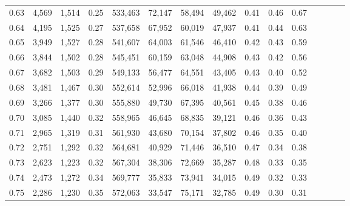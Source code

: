 \begin{tabular}{rrrcrrrrrrrrrrr}
0.63 &   4,569 &   1,514 &                                       0.25 &  533,463 &   72,147 &   58,494 &   49,462 &  0.41 &  0.46 &                         0.67 \\
0.64 &   4,195 &   1,525 &                                       0.27 &  537,658 &   67,952 &   60,019 &   47,937 &  0.41 &  0.44 &                         0.63 \\
0.65 &   3,949 &   1,527 &                                       0.28 &  541,607 &   64,003 &   61,546 &   46,410 &  0.42 &  0.43 &                         0.59 \\
0.66 &   3,844 &   1,502 &                                       0.28 &  545,451 &   60,159 &   63,048 &   44,908 &  0.43 &  0.42 &                         0.56 \\
0.67 &   3,682 &   1,503 &                                       0.29 &  549,133 &   56,477 &   64,551 &   43,405 &  0.43 &  0.40 &                         0.52 \\
0.68 &   3,481 &   1,467 &                                       0.30 &  552,614 &   52,996 &   66,018 &   41,938 &  0.44 &  0.39 &                         0.49 \\
0.69 &   3,266 &   1,377 &                                       0.30 &  555,880 &   49,730 &   67,395 &   40,561 &  0.45 &  0.38 &                         0.46 \\
0.70 &   3,085 &   1,440 &                                       0.32 &  558,965 &   46,645 &   68,835 &   39,121 &  0.46 &  0.36 &                         0.43 \\
0.71 &   2,965 &   1,319 &                                       0.31 &  561,930 &   43,680 &   70,154 &   37,802 &  0.46 &  0.35 &                         0.40 \\
0.72 &   2,751 &   1,292 &                                       0.32 &  564,681 &   40,929 &   71,446 &   36,510 &  0.47 &  0.34 &                         0.38 \\
0.73 &   2,623 &   1,223 &                                       0.32 &  567,304 &   38,306 &   72,669 &   35,287 &  0.48 &  0.33 &                         0.35 \\
0.74 &   2,473 &   1,272 &                                       0.34 &  569,777 &   35,833 &   73,941 &   34,015 &  0.49 &  0.32 &                         0.33 \\
0.75 &   2,286 &   1,230 &                                       0.35 &  572,063 &   33,547 &   75,171 &   32,785 &  0.49 &  0.30 &                         0.31 \\

\end{tabular}
